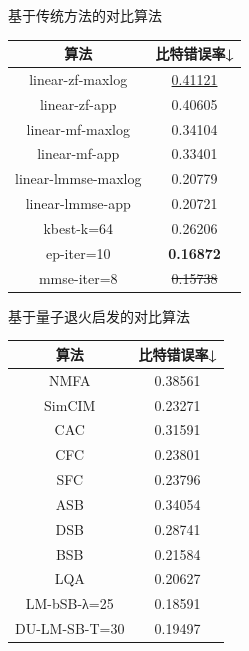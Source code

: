 \documentclass[withoutpreface,bwprint]{cumcmthesis}
\begin{document}
\begin{minipage}{\textwidth}
\begin{minipage}[t]{0.45\textwidth}
	\centering
	\makeatletter{}\makeatother
	\caption{基于传统方法的对比算法\label{tbl:result-c}}
	\begin{tabular}{cc} 
		\textbf{算法} 			& \textbf{比特错误率↓} \\
		\hline
		linear-zf-maxlog		& \underline{0.41121} \\
		linear-zf-app			& 0.40605 \\
		linear-mf-maxlog		& 0.34104 \\
		linear-mf-app		& 0.33401 \\
		linear-lmmse-maxlog	& 0.20779 \\
		linear-lmmse-app		& 0.20721 \\
		kbest-k=64			& 0.26206 \\
		ep-iter=10			& \textbf{0.16872} \\
		mmse-iter=8			& \sout{0.15738} \\
	\end{tabular}
\end{minipage}
\begin{minipage}[t]{0.45\textwidth}
	\centering
	\makeatletter{}\makeatother
	\caption{基于量子退火启发的对比算法\label{tbl:result-q}}
	\begin{tabular}{cc}        
		\textbf{算法} 						& \textbf{比特错误率↓} \\
		\hline
		NMFA   							& 0.38561 \\
		SimCIM \cite{Singh2021} 			& 0.23271 \\
		CAC    							& 0.31591 \\
		CFC    							& 0.23801 \\
		SFC    							& 0.23796 \\
		ASB    							& 0.34054 \\
		DSB   							& 0.28741 \\
		BSB \cite{Goto2021} 				& 0.21584 \\
		LQA   							& 0.20627 \\
		LM-bSB-λ=25 \cite{Takabe2023} 	& 0.18591 \\
		DU-LM-SB-T=30 \cite{Takabe2023}	& 0.19497 \\
	\end{tabular}
\end{minipage}
\end{minipage}
\end{document}
